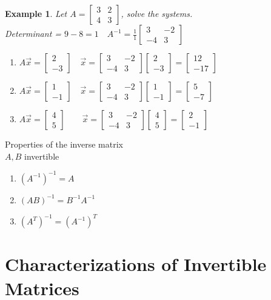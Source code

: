 \documentclass[a4paper,12pt,openany]{book}
\theoremstyle{defn}
\theoremstyle{expl}
\newtheorem{expl}{Example}[section]
\begin{document}
\begin{expl}\textup{Let $A=\left[\begin{array}{cc}3&2\\4&3\end{array}\right]$, solve the systems.\\
Determinant = $9-8=1\quad A^{-1}=\frac{1}{1}\left[\begin{array}{rr}3&-2\\-4&3\end{array}\right]$}
\begin{enumerate}
\item $A\vec{x}=\left[\begin{array}{r}2\\-3\end{array}\right] \quad \vec{x}=\left[\begin{array}{rr}3&-2\\-4&3\end{array}\right]\left[\begin{array}{r}2\\-3\end{array}\right]=\left[\begin{array}{r}12\\-17\end{array}\right] $
\item $A\vec{x}=\left[\begin{array}{r}1\\-1\end{array}\right]\quad \vec{x}=\left[\begin{array}{rr}3&-2\\-4&3\end{array}\right]\left[\begin{array}{r}1\\-1\end{array}\right]=\left[\begin{array}{r}5\\-7\end{array}\right] $
\item $A\vec{x}=\left[\begin{array}{r}4\\5\end{array}\right]\qquad \vec{x}=\left[\begin{array}{rr}3&-2\\-4&3\end{array}\right]\left[\begin{array}{r}4\\5\end{array}\right]=\left[\begin{array}{r}2\\-1\end{array}\right] $
\end{enumerate}
\end{expl}
\noindent Properties of the inverse matrix\\
$A,B$ invertible
\begin{multicols}{2}
\begin{enumerate}
\item $(A^{-1})^{-1}=A$
\item $(AB)^{-1}=B^{-1}A^{-1}$
\item $(A^T)^{-1}=(A^{-1})^T$
\end{enumerate}
\end{multicols}
\section{Characterizations of Invertible Matrices}
\end{document}
